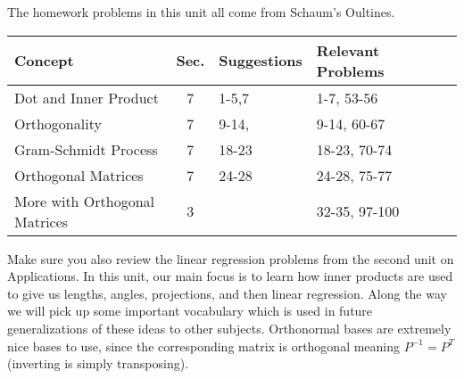 





The homework problems in this unit all come from Schaum's Oultines. 
\begin{center}
\begin{tabular}{|l|c|l|l|l|l|}
\hline
Concept&Sec.&Suggestions&Relevant Problems\\ \hline
Dot and Inner Product&7&1-5,7&1-7, 53-56\\ \hline
Orthogonality&7&9-14,&9-14, 60-67\\ \hline
Gram-Schmidt Process&7&18-23&18-23, 70-74\\ \hline
Orthogonal Matrices&7&24-28&24-28, 75-77\\ \hline
More with Orthogonal Matrices&3&&32-35, 97-100\\ \hline
\end{tabular}
\end{center}
Make sure you also review the linear regression problems from the second unit on Applications.  In this unit, our main focus is to learn how inner products are used to give us lengths, angles, projections, and then linear regression. Along the way we will pick up some important vocabulary which is used in future generalizations of these ideas to other subjects.  Orthonormal bases are extremely nice bases to use, since the corresponding matrix is orthogonal meaning $P^{-1}=P^T$ (inverting is simply transposing).



